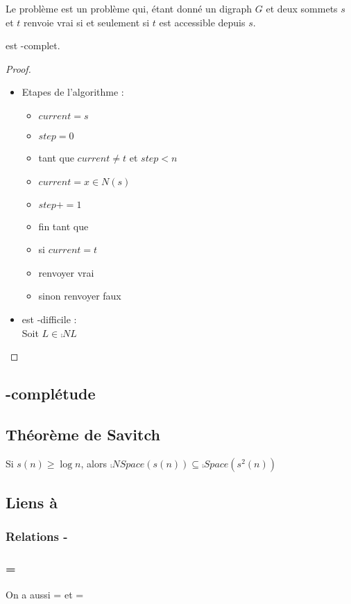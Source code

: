 \documentclass{cours}
\begin{document}
\begin{definition}
    Le problème  est un problème qui, étant donné un digraph $G$ et deux sommets $s$ et $t$ renvoie vrai si et seulement si $t$ est accessible depuis $s$. 
\end{definition}

\begin{proposition}
     est -complet.
\end{proposition}
\begin{proof}
    \begin{itemize}
        \item Etapes de l'algorithme : 
        \begin{itemize}
            \item $current = s$
            \item $step = 0$
            \item tant que $current \neq t$ et $step < n$
            \item $current = x \in N(s)$
            \item $step += 1$
            \item fin tant que
            \item si $current = t$
            \item renvoyer vrai
            \item sinon renvoyer faux
        \end{itemize}
        \item {} est -difficile :\\
        Soit $L\in \comp{NL}$
    \end{itemize}
\end{proof}


\subsection{-complétude}

\subsection{Théorème de Savitch}
\begin{theorem}
    Si $s(n) \geq \log n$, alors $\comp{NSpace}(s(n)) \subseteq \comp{Space}(s^{2}(n))$
\end{theorem}




\subsection{Liens à }
\subsubsection{Relations  - }

\subsubsection{ = }
On a aussi  =  et  = 
\end{document}
